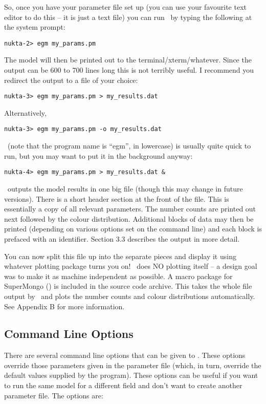 So, once you have your parameter file set up (you can use your favourite
text editor to do this -- it is just a text file) you can run \egm\ by 
typing the following at the system prompt:
\begin{verbatim}
nukta-2> egm my_params.pm
\end{verbatim}
The model will then be printed out to the terminal/xterm/whatever. Since
the output can be 600 to 700 lines long this is not terribly
useful. I recommend you redirect the output to a file of your choice:
\begin{verbatim}
nukta-3> egm my_params.pm > my_results.dat
\end{verbatim}
Alternatively,
\begin{verbatim}
nukta-3> egm my_params.pm -o my_results.dat
\end{verbatim}
\egm\ (note that the program name is ``egm'', in lowercase) is usually quite
quick to run, but you may want to put it in the background anyway:
\begin{verbatim}
nukta-4> egm my_params.pm > my_results.dat &
\end{verbatim}
\egm\ outputs the model results in one big file (though this may change in 
future versions).
There is a short header section at the front of the file. This is
essentially a copy of all relevant parameters. The number counts are printed  
out next followed by the colour distribution. Additional blocks of data may 
then be printed (depending on various options set on the command line) and
each block is prefaced with an identifier. Section 3.3 describes the output
in more detail.

You can now split this file up into the separate pieces and display it using
whatever plotting package turns you on! \egm\ does NO plotting itself -- a
design goal was to make it as machine independent as possible.
A macro package for SuperMongo (\sm) is included in the source code
archive. This
takes the whole file output by \egm\ and plots the number counts and
colour distributions automatically. See Appendix B for more information.
 
\subsection{Command Line Options}

There are several command line options that can be given to \egm. These
options override those parameters given in the parameter file (which, in turn,
override the default values supplied by the program).
These options can be useful if you want to run the same model
for a different field and don't want to create another parameter file.
The options are:
\medskip

